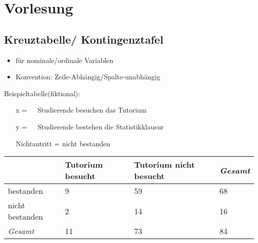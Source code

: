 \section{Vorlesung}

\subsection{Kreuztabelle/ Kontingenztafel}

  \begin{itemize}
    \item für nominale/ordinale Variablen
    \item Konvention: Zeile-Abhängig/Spalte-unabhängig
  \end{itemize}
\vspace{1cm}
Beispieltabelle(fiktional): \\
 \begin{itemize}
   \item [x] =~~~Studierende besuchen das Tutorium
   \item [y] =~~~Studierende bestehen die Statistikklausur
   \item [] Nichtantritt = nicht bestanden
 \end{itemize}

 \begin{tabular}{p{2cm}|p{2cm}|p{2cm}|p{2cm}}
    {}              & Tutorium besucht & Tutorium nicht besucht & \textit{Gesamt}
\\\hline
    bestanden       & 9                & 59                     & 68
\\\hline
    nicht bestanden & 2                & 14                     & 16
\\\hline
    \textit{Gesamt} & 11               & 73                     & 84
 \end{tabular}

